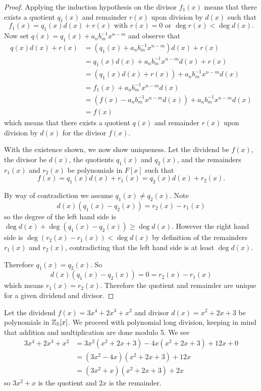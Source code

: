 \begin{proof}
    Applying the induction hypothesis on the divisor $f_1(x)$ means that there exists a quotient $q_1(x)$ and remainder $r(x)$ upon division by $d(x)$ such that
    \[
        f_1(x) = q_1(x)d(x) + r(x) \text{ with } r(x) = 0 \text{ or } \deg r(x) < \deg d(x).
    \]
    Now set $q(x) = q_1(x) + a_nb_m^{-1}x^{n-m}$ and observe that
    \begin{align*}
        q(x)d(x) + r(x) &= (q_1(x) + a_nb_m^{-1}x^{n-m})d(x) + r(x)\\
        &= q_1(x)d(x) + a_nb_m^{-1}x^{n-m}d(x) + r(x)\\
        &= (q_1(x)d(x) + r(x)) + a_nb_m^{-1}x^{n-m}d(x)\\
        &= f_1(x) + a_nb_m^{-1}x^{n-m}d(x)\\
        &= (f(x) - a_nb_m^{-1}x^{n-m}d(x)) + a_nb_m^{-1}x^{n-m}d(x)\\
        &= f(x)
    \end{align*}
    which means that there exists a quotient $q(x)$ and remainder $r(x)$ upon division by $d(x)$ for the divisor $f(x)$.

    With the existence shown, we now show uniqueness. Let the dividend be $f(x)$, the divisor be $d(x)$, the quotients $q_1(x)$ and $q_2(x)$, and the remainders $r_1(x)$ and $r_2(x)$ be polynomials in $F[x]$ such that
    \[
        f(x) = q_1(x)d(x) + r_1(x) = q_2(x)d(x) + r_2(x).
    \]
    
    By way of contradiction we assume $q_1(x) \neq q_2(x)$. Note
    \[
        d(x)(q_1(x) - q_2(x)) = r_2(x) - r_1(x)
    \]
    so the degree of the left hand side is $\deg d(x) + \deg(q_1(x) - q_2(x)) \geq \deg d(x)$. However the right hand side is $\deg(r_2(x) - r_1(x)) < \deg d(x)$ by definition of the remainders $r_1(x)$ and $r_2(x)$, contradicting that the left hand side is at least $\deg d(x)$.

    Therefore $q_1(x) = q_2(x)$. So
    \[
        d(x)(q_1(x) - q_2(x)) = 0 = r_2(x) - r_1(x)
    \]
    which means $r_1(x) = r_2(x)$. Therefore the quotient and remainder are unique for a given dividend and divisor.
\end{proof}

\begin{example}
    Let the dividend $f(x) = 3x^4 + 2x^3 + x^2$ and divisor $d(x) = x^2 + 2x + 3$ be polynomials in $\mathbb{Z}_5[x]$. We proceed with polynomial long division, keeping in mind that addition and multiplication are done modulo 5. We see
    \begin{align*}
        3x^4 + 2x^3 + x^2 &= 3x^2(x^2 + 2x + 3) - 4x(x^2 + 2x + 3) + 12x + 0\\
        &= (3x^2-4x)(x^2+2x+3) + 12x\\
        &= (3x^2+x)(x^2+2x+3) + 2x
    \end{align*}
    so $3x^2+x$ is the quotient and $2x$ is the remainder.
\end{example}

